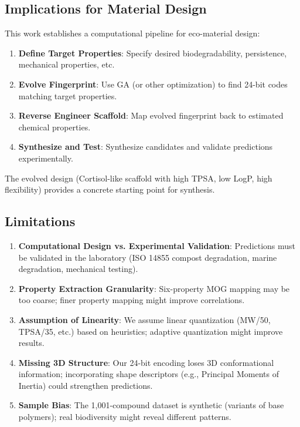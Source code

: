 \documentclass[11pt,letterpaper]{article}
\begin{document}
\subsection{Implications for Material Design}

This work establishes a computational pipeline for eco-material design:

\begin{enumerate}
    \item \textbf{Define Target Properties}: Specify desired biodegradability, persistence, mechanical properties, etc.
    
    \item \textbf{Evolve Fingerprint}: Use GA (or other optimization) to find 24-bit codes matching target properties.
    
    \item \textbf{Reverse Engineer Scaffold}: Map evolved fingerprint back to estimated chemical properties.
    
    \item \textbf{Synthesize and Test}: Synthesize candidates and validate predictions experimentally.
\end{enumerate}

The evolved design (Cortisol-like scaffold with high TPSA, low LogP, high flexibility) provides a concrete starting point for synthesis.

\subsection{Limitations}

\begin{enumerate}
    \item \textbf{Computational Design vs. Experimental Validation}: Predictions must be validated in the laboratory (ISO 14855 compost degradation, marine degradation, mechanical testing).
    
    \item \textbf{Property Extraction Granularity}: Six-property MOG mapping may be too coarse; finer property mapping might improve correlations.
    
    \item \textbf{Assumption of Linearity}: We assume linear quantization (MW/50, TPSA/35, etc.) based on heuristics; adaptive quantization might improve results.
    
    \item \textbf{Missing 3D Structure}: Our 24-bit encoding loses 3D conformational information; incorporating shape descriptors (e.g., Principal Moments of Inertia) could strengthen predictions.
    
    \item \textbf{Sample Bias}: The 1,001-compound dataset is synthetic (variants of base polymers); real biodiversity might reveal different patterns.
\end{enumerate}
\end{document}
